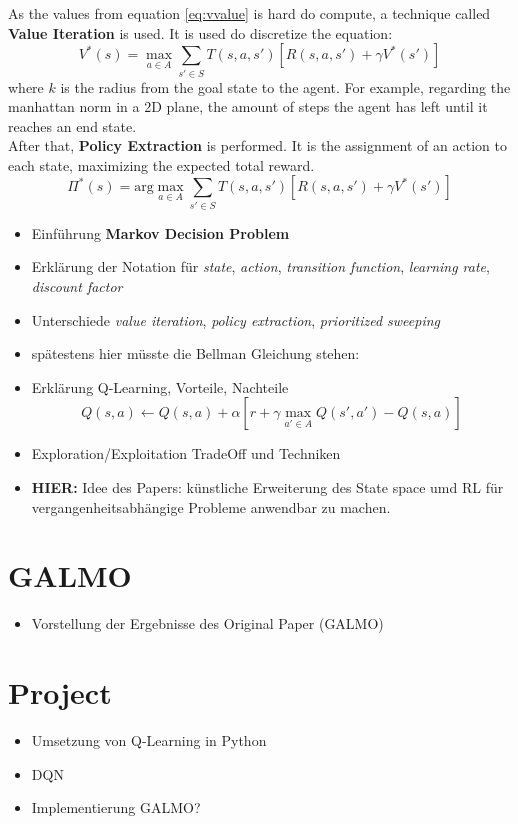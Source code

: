 \documentclass[a4paper]{article}
\begin{document}
	As the values from equation \ref{eq:vvalue} is hard do compute, a technique called \textbf{Value Iteration} is used. It is used do discretize the equation: 
	\begin{equation}\label{eq:value-iteration}
		V^*(s) = \max_{a \in A} \sum_{s' \in S}^{} T(s,a,s')[R(s,a,s')+\gamma V^*(s')]
	\end{equation}
	where $k$ is the radius from the goal state to the agent. For example, regarding the manhattan norm in a 2D plane, the amount of steps the agent has left until it reaches an end state.\\
	After that, \textbf{Policy Extraction} is performed. It is the assignment of an action to each state, maximizing the expected total reward.
	\begin{equation}
		\Pi^*(s) = \text{arg}\max_{a \in A} \sum_{s' \in S}^{} T(s,a,s')[R(s,a,s')+\gamma V^*(s')]
	\end{equation}
	\begin{itemize}
		\item Einführung \textbf{Markov Decision Problem}
		\item Erklärung der Notation für \textit{state}, \textit{action}, \textit{transition function}, \textit{learning rate}, \textit{discount factor}
		\item Unterschiede \textit{value iteration}, \textit{policy extraction}, \textit{prioritized sweeping}
		\item spätestens hier müsste die Bellman Gleichung stehen:
		
		\item Erklärung Q-Learning, Vorteile, Nachteile
		$$Q(s,a) \leftarrow Q(s,a) + \alpha[r + \gamma \max_{a' \in A}Q(s',a')-Q(s,a)]$$
		\item Exploration/Exploitation TradeOff und Techniken
		\item \textbf{HIER:} Idee des Papers: künstliche Erweiterung des State space umd RL für vergangenheitsabhängige Probleme anwendbar zu machen.
	\end{itemize}
	
	
	\section{GALMO}
	\label{sec:galmo}
	\begin{itemize}
		\item Vorstellung der Ergebnisse des Original Paper (GALMO)
	\end{itemize}
	
	
	\section{Project}
	\label{sec:project}
	\begin{itemize}
		\item Umsetzung von Q-Learning in Python
		\item DQN
		\item Implementierung GALMO?
	\end{itemize}
	
\end{document}
